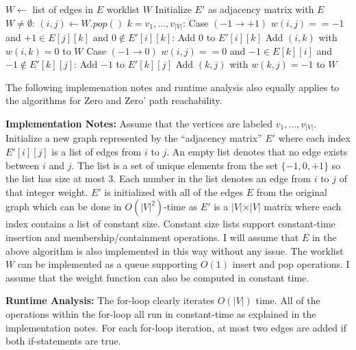 \documentclass[11pt]{article}
\theoremstyle{remark}
\theoremstyle{remark}
\begin{document}
\begin{enumerate}
    \begin{codebox}
      \li $W \gets$ list of edges in $E$ \qquad \Comment worklist $W$
      \li Initialize $E'$ as adjacency matrix with $E$
      \li \While $W \neq \emptyset$:
      \Do
        \li $(i,j) \gets W.pop()$
        \li \For $k=v_1, \ldots, v_{\vert V \vert}$:
            \Do
              \li \Comment Case $(-1 \rightarrow +1)$
              \li \If $w(i,j) == -1$ and $+1\in E[j][k]$ and $0 \not\in E'[i][k]$:
              \li \Then Add $0$ to $E'[i][k]$
              \li Add $(i,k)$ with $w(i,k)=0$ to $W$
                  \End
              \li
              \li \Comment Case $(-1 \rightarrow 0)$
              \li \If $w(i,j) == 0$ and $-1 \in E[k][i]$ and $-1 \not\in E'[k][j]$:
              \li \Then Add $-1$ to $E'[k][j]$
              \li Add $(k,j)$ with $w(k,j)=-1$ to $W$
                  \End
            \End
      \End
    \end{codebox}

    \noindent The following implemenation notes and runtime analysis also equally applies to the algorithms for Zero and Zero' path reachability.
    
    \noindent\textbf{Implementation Notes:} Assume that the vertices are labeled $v_1,\ldots,v_{\vert V \vert}$. Initialize a new graph represented by the ``adjacency matrix'' $E'$ where each index $E'[i][j]$ is a list of edges from $i$ to $j$. An empty list denotes that no edge exists between $i$ and $j$. The list is a set of unique elements from the set $\{-1,0,+1\}$ so the list has size at most 3. Each number in the list denotes an edge from $i$ to $j$ of that integer weight. $E'$ is initialized with all of the edges $E$ from the original graph which can be done in $O(\vert V \vert^2)$-time as $E'$ is a $\vert V \vert \times \vert V \vert$ matrix where each index contains a list of constant size. Constant size lists support constant-time insertion and membership/containment operations. I will assume that $E$ in the above algorithm is also implemented in this way without any issue. The worklist $W$ can be implemented as a queue supporting $O(1)$ insert and pop operations. I assume that the weight function can also be computed in constant time.

    \noindent\textbf{Runtime Analysis:} The for-loop clearly iterates $O(\vert V \vert)$ time. All of the operations within the for-loop all run in constant-time as explained in the implementation notes. For each for-loop iteration, at most two edges are added if both if-statements are true.
    

\end{enumerate}
\end{document}
